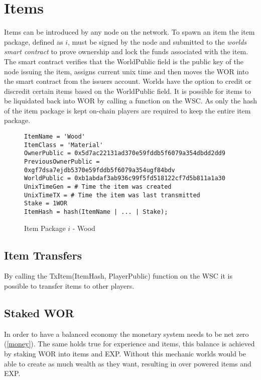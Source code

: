 \documentclass[runningheads,a4paper]{llncs}
\begin{document}
\section{Items} 
\label{items}
Items can be introduced by any node on the network. To spawn an item the item package, defined as $i$, must be signed by the node and submitted to the \textit{worlds smart contract} to prove ownership and lock the funds associated with the item. The smart contract verifies that the WorldPublic field is the public key of the node issuing the item, assigns current unix time and then moves the WOR into the smart contract from the issuers account. Worlds have the option to credit or discredit certain items based on the WorldPublic field.  It is possible for items to be liquidated back into WOR by calling a function on the WSC. As only the hash of the item package is kept on-chain players are required to keep the entire item package.

\begin{figure}[H]
\centering
\label{itempkg}
\caption{Item Package $i$ - Wood}
\begin{lstlisting}
ItemName = 'Wood'
ItemClass = 'Material'
OwnerPublic = 0x5d7ac22131ad370e59fddb5f6079a354dbdd2dd9
PreviousOwnerPublic = 0xgf7dsa7ejdb5370e59fddb5f6079a354ugf84bdv
WorldPublic = 0xb1abdaf3ab936c99f5fd518122cf7d5b811a1a30
UnixTimeGen = # Time the item was created
UnixTimeTX = # Time the item was last transmitted
Stake = 1WOR
ItemHash = hash(ItemName | ... | Stake);
\end{lstlisting}
\end{figure}

\subsection{Item Transfers}
By calling the TxItem(ItemHash, PlayerPublic) function on the WSC it is possible to transfer items to other players.

\subsection{Staked WOR}
In order to have a balanced economy the monetary system needs to be net zero (\ref{money}). The same holds true for experience and items, this balance is achieved by staking WOR into items and EXP. Without this mechanic worlds would be able to create as much wealth as they want, resulting in over powered items and EXP. 
\end{document}

